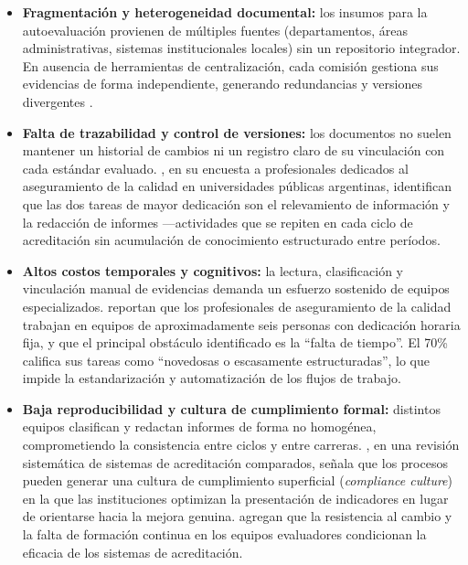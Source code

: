 \begin{itemize}
    \item \textbf{Fragmentación y heterogeneidad documental:} los insumos para la autoevaluación provienen de múltiples fuentes (departamentos, áreas administrativas, sistemas institucionales locales) sin un repositorio integrador. En ausencia de herramientas de centralización, cada comisión gestiona sus evidencias de forma independiente, generando redundancias y versiones divergentes \citep{greiner2023plan, sanabria2023procesos}.

    \item \textbf{Falta de trazabilidad y control de versiones:} los documentos no suelen mantener un historial de cambios ni un registro claro de su vinculación con cada estándar evaluado. \citet{marquina2022implicancias}, en su encuesta a profesionales dedicados al aseguramiento de la calidad en universidades públicas argentinas, identifican que las dos tareas de mayor dedicación son el relevamiento de información y la redacción de informes ---actividades que se repiten en cada ciclo de acreditación sin acumulación de conocimiento estructurado entre períodos.

    \item \textbf{Altos costos temporales y cognitivos:} la lectura, clasificación y vinculación manual de evidencias demanda un esfuerzo sostenido de equipos especializados. \citet{marquina2022implicancias} reportan que los profesionales de aseguramiento de la calidad trabajan en equipos de aproximadamente seis personas con dedicación horaria fija, y que el principal obstáculo identificado es la ``falta de tiempo''. El 70\% califica sus tareas como ``novedosas o escasamente estructuradas'', lo que impide la estandarización y automati\-zación de los flujos de trabajo.

    \item \textbf{Baja reproducibilidad y cultura de cumplimiento formal:} distintos equipos clasifican y redactan informes de forma no homogénea, comprometiendo la consistencia entre ciclos y entre carreras. \citet{duarte2023literature}, en una revisión sistemática de sistemas de acreditación comparados, señala que los procesos pueden generar una cultura de cumplimiento superficial (\textit{compliance culture}) en la que las instituciones optimizan la presentación de indicadores en lugar de orientarse hacia la mejora genuina. \citet{casadiego2025acreditacion} agregan que la resistencia al cambio y la falta de formación continua en los equipos evaluadores condicionan la eficacia de los sistemas de acreditación.
\end{itemize}

